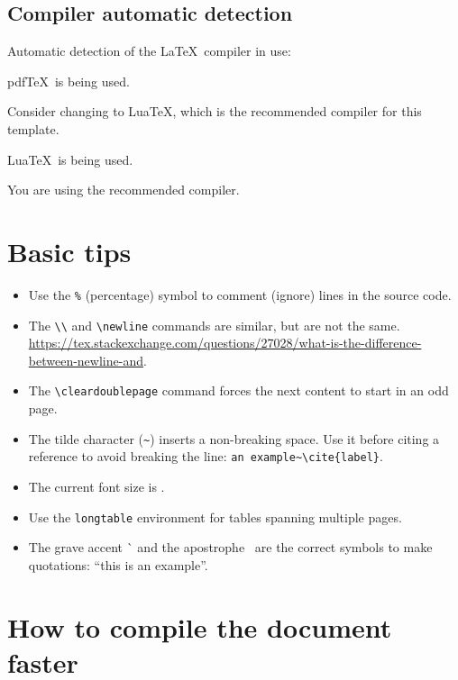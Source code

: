 \subsection{Compiler automatic detection}

Automatic detection of the \LaTeX\ compiler in use:

\ifPDFTeX
{\color{red} pdf\TeX\ is being used.}

Consider changing to Lua\TeX, which is the recommended compiler for this template.
\fi

\ifLuaTeX
{\color{Green4} Lua\TeX\ is being used.}

You are using the recommended compiler.
\fi


\section{Basic tips}
\label{c2:s:basic-tips}

\begin{itemize}
\item
Use the \verb+%+ (percentage) symbol to comment (ignore) lines in the source code.
\item
The \verb+\\+ and \verb+\newline+ commands are similar, but are not the same.\\
\url{https://tex.stackexchange.com/questions/27028/what-is-the-difference-between-newline-and}.
\item
The \verb+\cleardoublepage+ command forces the next content to start in an odd page.
\item
The tilde character (\verb+~+) inserts a non-breaking space.
Use it before citing a reference to avoid breaking the line: \verb+an example~\cite{label}+.
\item
The current font size is \myfontsize.
\item
Use the \verb+longtable+ environment for tables spanning multiple pages.
\item
The grave accent \`{} and the apostrophe \textquotesingle\ are the correct symbols to make quotations: ``this is an example''.
\end{itemize}


\section{How to compile the document faster}
\label{c2:s:how-to-compile-the-document-faster}

